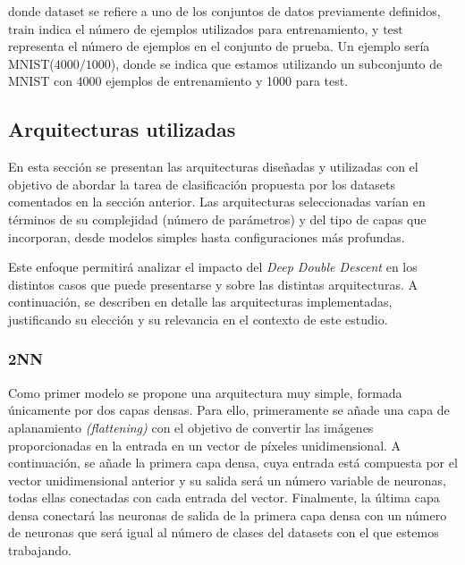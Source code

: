 donde $\text{dataset}$ se refiere a uno de los conjuntos de datos previamente definidos, $\text{train}$ indica el número de ejemplos utilizados para entrenamiento, y $\text{test}$ representa el número de ejemplos en el conjunto de prueba. Un ejemplo sería MNIST($4000/1000$), donde se indica que estamos utilizando un subconjunto de MNIST con 4000 ejemplos de entrenamiento y 1000 para test.\newline

\subsection{Arquitecturas utilizadas}\label{subsec:arquitecturas}

En esta sección se presentan las arquitecturas diseñadas y utilizadas con el objetivo de abordar la tarea de clasificación propuesta por los datasets comentados en la sección anterior. Las arquitecturas seleccionadas varían en términos de su complejidad (número de parámetros) y del tipo de capas que incorporan, desde modelos simples hasta configuraciones más profundas.\newline

Este enfoque permitirá analizar el impacto del \textit{Deep Double Descent} en los distintos casos que puede presentarse y sobre las distintas arquitecturas. A continuación, se describen en detalle las arquitecturas implementadas, justificando su elección y su relevancia en el contexto de este estudio.\newline

\subsubsection{2NN}\label{subsubsec:2NN}

Como primer modelo se propone una arquitectura muy simple, formada únicamente por dos capas densas. Para ello, primeramente se añade una capa de aplanamiento \textit{(flattening)} con el objetivo de convertir las imágenes proporcionadas en la entrada en un vector de píxeles unidimensional. A continuación, se añade la primera capa densa, cuya entrada está compuesta por el vector unidimensional anterior y su salida será un número variable de neuronas, todas ellas conectadas con cada entrada del vector. Finalmente, la última capa densa conectará las neuronas de salida de la primera capa densa con un número de neuronas que será igual al número de clases del datasets con el que estemos trabajando.\newline

